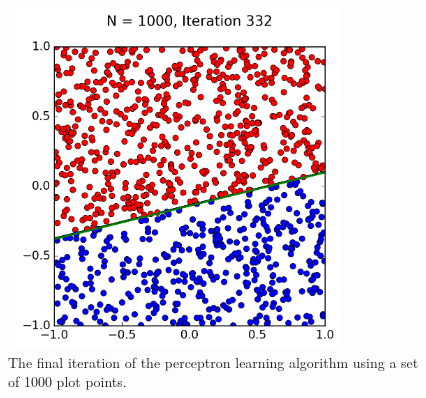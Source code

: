 \documentclass[a4paper]{article}
\begin{document}
\begin{figure}
  \includegraphics[width=9cm,height=9cm]{p_N1000_it332.png}
  \caption{The final iteration of the perceptron learning algorithm using a set of 1000 plot points.}
  \label{fig:PartE3}
\end{figure}
\end{document}
